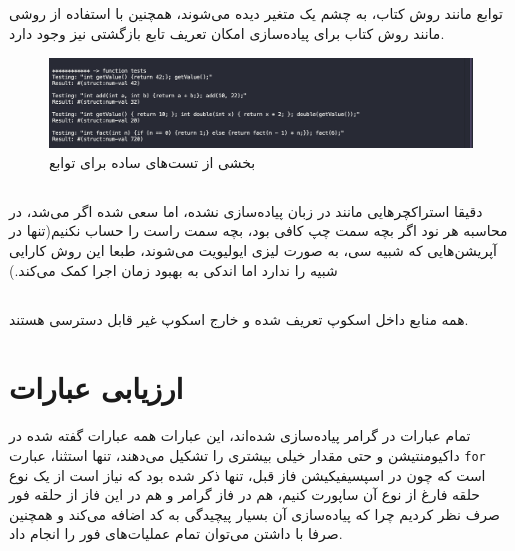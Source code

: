 \documentclass{article}
\begin{document}
\subsection{}
توابع مانند روش کتاب، به چشم یک متغیر دیده می‌شوند، همچنین با استفاده از روشی مانند روش کتاب برای پیاده‌سازی 
امکان تعریف تابع بازگشتی نیز وجود دارد.
\begin{figure}[h]
        \centering
        \includegraphics[width=1\linewidth]{pics/func1.png}
        \caption{بخشی از تست‌های ساده برای توابع}
\end{figure}
\subsection{}
دقیقا استراکچر‌‌هایی مانند 
در زبان پیاده‌سازی نشده، اما سعی شده اگر می‌شد، در محاسبه 
هر نود 
اگر بچه سمت چپ کافی بود، بچه سمت راست را حساب نکنیم(تنها در آپریشن‌هایی که شبیه سی، به صورت لیزی ایولیویت می‌شوند، طبعا این روش کارایی شبیه  را ندارد اما اندکی به بهبود زمان اجرا کمک می‌کند.)
\subsection{}
همه منابع داخل اسکوپ تعریف شده و خارج اسکوپ غیر قابل دسترسی هستند.
\section{ارزیابی عبارات}
تمام عبارات در گرامر پیاده‌سازی شده‌اند، 
این عبارات همه عبارات گفته شده در داکیومنتیشن و حتی مقدار خیلی بیشتری را تشکیل می‌دهند، تنها استثنا، عبارت
\texttt{for}
است که چون در اسپسیفیکیشن فاز قبل، تنها ذکر شده بود که نیاز است از یک نوع حلقه فارغ از نوع آن ساپورت کنیم، هم در فاز گرامر و هم در این فاز از 
حلقه فور صرف نظر کردیم چرا که پیاده‌سازی آن بسیار پیچیدگی به کد اضافه می‌کند و همچنین 
صرفا با داشتن 
می‌توان تمام عملیات‌های فور را انجام داد.
\end{document}
